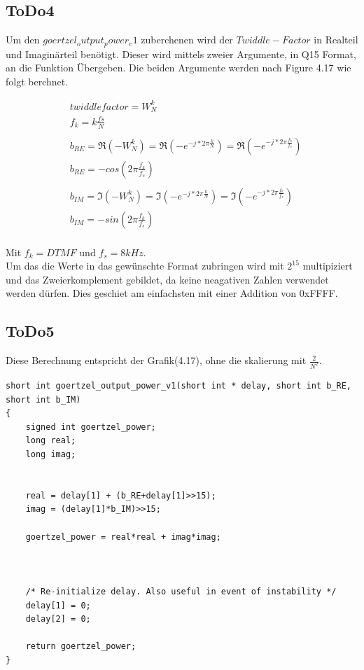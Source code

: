 \documentclass[a4paper,11pt]{article}
\begin{document}
\subsection{ToDo4}
Um den $goertzel_output_power_v1$ zuberchenen wird der $Twiddle-Factor$ in Realteil und Imaginärteil benötigt. Dieser wird mittels zweier Argumente, in Q15 Format, an die Funktion Übergeben. Die beiden Argumente werden nach Figure 4.17 wie folgt berchnet.

\begin{align*}
	&twiddlefactor = W^{k}_{N} \\
	&f_k = k\frac{fs}{N} \\\\
	&b_{RE} =\Re{(-W^{k}_{N})} = \Re{(-e^{-j*2\pi \frac{k}{N}})}=  \Re{(-e^{-j*2\pi \frac{f_k}{f_s}})}\\
	&b_{RE} = -cos(2\pi\frac{f_k}{f_s})\\\\
	&b_{IM} =\Im{(-W^{k}_{N})} = \Im{(-e^{-j*2\pi \frac{k}{N}})}=  \Im{(-e^{-j*2\pi \frac{f_k}{f_s}})}\\
	&b_{IM} = -sin(2\pi\frac{f_k}{f_s})
\end{align*}
\\
Mit $f_k = DTMF$ und $f_s = 8kHz$.
\\
Um das die Werte in das gewünschte Format zubringen wird mit $2^{15}$ multipiziert und das Zweierkomplement gebildet, da keine neagativen Zahlen verwendet werden dürfen. Dies geschiet am einfachsten mit einer Addition von 0xFFFF.

\subsection{ToDo5}
Diese Berechnung entspricht der Grafik(4.17), ohne die skalierung mit $\frac{2}{N^2}$.
\begin{lstlisting}
short int goertzel_output_power_v1(short int * delay, short int b_RE, short int b_IM)
{
	signed int goertzel_power;
	long real;
	long imag;


	real = delay[1] + (b_RE+delay[1]>>15);
	imag = (delay[1]*b_IM)>>15;

	goertzel_power = real*real + imag*imag;



    /* Re-initialize delay. Also useful in event of instability */
	delay[1] = 0;
	delay[2] = 0;

	return goertzel_power;
}
\end{lstlisting}
\end{document}
